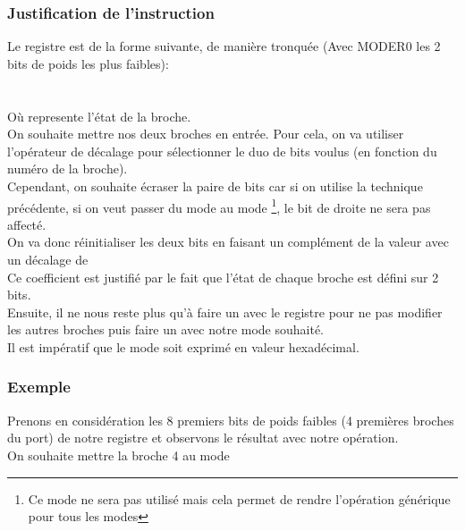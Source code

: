 \subsubsection{Justification de l'instruction}

Le registre  est de la forme suivante, de manière tronquée (Avec MODER0 les 2 bits de poids les plus faibles): \\
   \\
\quad\quad\quad{} \quad\quad\quad{}\quad\quad\quad{}    \quad\quad{}\\


Où  represente l'état de la broche.\\

On souhaite mettre nos deux broches en entrée. Pour cela, on va utiliser l'opérateur de décalage pour sélectionner le duo de bits voulus (en fonction du numéro de la broche). \\

Cependant, on souhaite écraser la paire de bits car si on utilise la technique précédente, si on veut passer du mode   au mode \footnote{Ce mode ne sera pas utilisé mais cela permet de rendre l'opération générique pour tous les modes}, le bit de droite ne sera pas affecté.\\

On va donc réinitialiser les deux bits en faisant un complément de la valeur  avec un décalage de  \\


Ce coefficient est justifié par le fait que l'état de chaque broche est défini sur 2 bits. \\

Ensuite, il ne nous reste plus qu'à faire un  avec le registre pour ne pas modifier les autres broches puis faire un  avec notre mode souhaité. \\
Il est impératif que le mode soit exprimé en valeur hexadécimal.

\subsubsection{Exemple}
Prenons en considération les 8 premiers bits de poids faibles (4 premières broches du port) de notre registre  et observons le résultat avec notre opération.\\
On souhaite mettre la broche 4 au mode  \\

